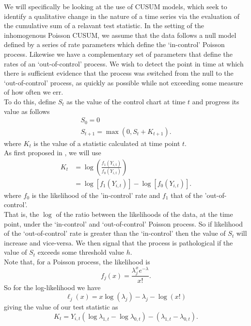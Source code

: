 \documentclass[11pt]{report}
\begin{document}
We will specifically be looking at the use of CUSUM models, which seek to identify a qualitative change in the nature of a time series via the evaluation of the cumulative sum of a relavant test statistic. In the setting of the inhomogenous Poisson CUSUM, we assume that the data follows a null model defined by a series of rate parameters which define the `in-control' Poisson process. Likewise we have a complementary set of parameters that define the rates of an `out-of-control' process. We wish to detect the point in time at which there is sufficient evidence that the process was switched from the null to the `out-of-control' process, as quickly as possible while not exceeding some measure of how often we err. \\

To do this, define $S_t$ as the value of the control chart at time $t$ and progress its value as follows
\begin{gather}
S_0 = 0 \\
S_{t+1} = \max{(0, S_t + K_{t+1})}.
\end{gather}
where $K_t$ is the value of a statistic calculated at time point $t$. \\

As first proposed in \citet{page}, we will use
\begin{align}
K_t &= \log{\left(\frac{f_1(Y_{i,t})}{f_0(Y_{i,t})}\right)} \\
    &= \log{[f_1(Y_{i,t})]} - \log{[f_0(Y_{i,t})]}.
\end{align}
where $f_0$ is the likelihood of the 'in-control' rate and $f_1$ that of the 'out-of-control'. \\

That is, the $\log$ of the ratio between the likelihoods of the data, at the time point, under the `in-control' and `out-of-control' Poisson process. So if likelihood of the `out-of-control' rate is greater than the `in-control' then the value of $S_t$ will increase and vice-versa. We then signal that the process is pathological if the value of $S_t$ exceeds some threshold value $h$. \\

Note that, for a Poisson process, the likelihood is
\begin{equation}
f_j(x) = \frac{\lambda_j^x e^{-\lambda}}{x!}.
\end{equation}
So for the log-likelihood we have
\begin{equation}
\ell_j(x) = x \log(\lambda_j) - \lambda_j - \log(x!)
\end{equation}
giving the value of our test statistic as
\begin{equation}
K_t = Y_{i,t} (\log{\lambda_{1, t}} - \log{\lambda_{0, t}}) - (\lambda_{1, t} - \lambda_{0, t}).
\end{equation}
\end{document}
